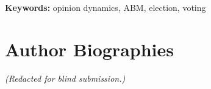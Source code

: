 \documentclass{scspaperproc}
\begin{document}
\textbf{Keywords:} opinion dynamics, ABM, election, voting
















\section*{Author Biographies}

\textit{(Redacted for blind submission.)}

%
\end{document}
